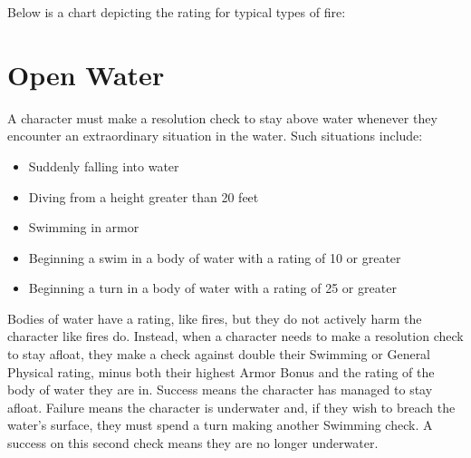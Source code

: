 \documentclass[oneside]{book}
\begin{document}
\begin{multicols}{2}
Below is a chart depicting the rating for typical types of fire: 


\begin{center}
\end{center}

\section{Open Water}

A character must make a resolution check to stay above water whenever they encounter an extraordinary situation in the water. Such situations include: 
\begin{itemize}
		\setlength{\itemsep}{0cm}%
  		\setlength{\parskip}{0cm}%
		\item{Suddenly falling into water}
		\item{Diving from a height greater than 20 feet}
		\item{Swimming in armor}
		\item{Beginning a swim in a body of water with a rating of 10 or greater}
		\item{Beginning a turn in a body of water with a rating of 25 or greater}
	\end{itemize}

Bodies of water have a rating, like fires, but they do not actively harm the character like fires do. Instead, when a character needs to make a resolution check to stay afloat, they make a check against double their Swimming or General Physical rating, minus both their highest Armor Bonus and the rating of the body of water they are in. Success means the character has managed to stay afloat. Failure means the character is underwater and, if they wish to breach the water's surface, they must spend a turn making another Swimming check. A success on this second check means they are no longer underwater.


\end{multicols}
\end{document}
